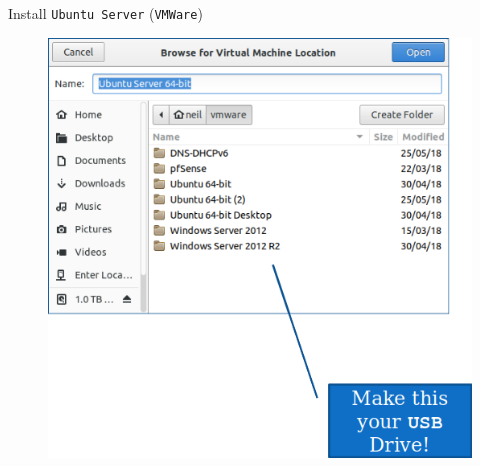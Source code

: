\documentclass[aspectratio=169]{beamer}
\begin{document}
\begin{frame}{Install \texttt{Ubuntu Server} (\texttt{VMWare})}
\begin{center}
\begin{figure}
\begin{overprint}
        \centering\includegraphics[width=.4\textwidth]{VMWare5.png}
        \centering{}
        \centering{}
        \centering{}
        \centering{}

\end{overprint}
\end{figure}
\end{center}
\end{frame}
\end{document}

